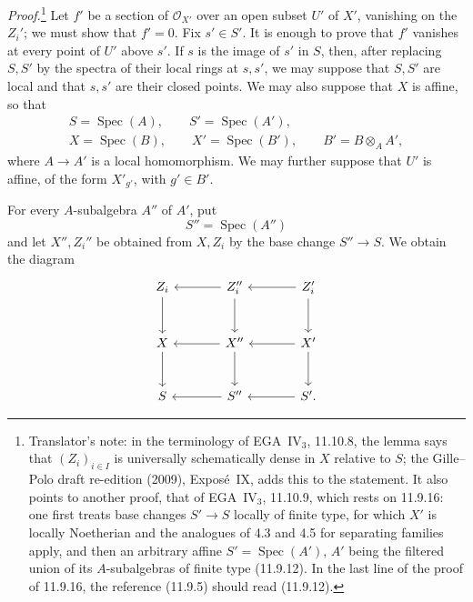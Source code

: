 \emph{Proof.}\footnote{Translator's note: in the terminology of
EGA~IV\(_3\), 11.10.8, the lemma says that \((Z_i)_{i\in I}\) is
universally schematically dense in \(X\) relative to \(S\); the
Gille--Polo draft re-edition (2009), Expos\'e~IX, adds this to the
statement. It also points to another proof, that of EGA~IV\(_3\),
11.10.9, which rests on 11.9.16: one first treats base changes
\(S'\to S\) locally of finite type, for which \(X'\) is locally
Noetherian and the analogues of 4.3 and 4.5 for separating families
apply, and then an arbitrary affine \(S'=\operatorname{Spec}(A')\), \(A'\)
being the filtered union of its \(A\)-subalgebras of finite type
(11.9.12). In the last line of the proof of 11.9.16, the reference
(11.9.5) should read (11.9.12).}
Let \(f'\) be a section of \(\mathscr O_{X'}\) over an open subset
\(U'\) of \(X'\), vanishing on the \(Z_i'\); we must show that \(f'=0\).
Fix \(s'\in S'\). It is enough to prove that \(f'\) vanishes at every
point of \(U'\) above \(s'\). If \(s\) is the image of \(s'\) in \(S\),
then, after replacing \(S,S'\) by the spectra of their local rings at
\(s,s'\), we may suppose that \(S,S'\) are local and that \(s,s'\) are
their closed points. We may also suppose that \(X\) is affine, so that
\[
  \begin{gathered}
    S=\operatorname{Spec}(A),\qquad
    S'=\operatorname{Spec}(A'),\\
    X=\operatorname{Spec}(B),\qquad
    X'=\operatorname{Spec}(B'),\qquad
    B'=B\otimes_A A',
  \end{gathered}
\]
where \(A\to A'\) is a local homomorphism. We may further suppose that
\(U'\) is affine, of the form \(X'_{g'}\), with \(g'\in B'\).

For every \(A\)-subalgebra \(A''\) of \(A'\), put
\[
  S''=\operatorname{Spec}(A'')
\]
and let \(X'',Z_i''\) be obtained from \(X,Z_i\) by the base change
\(S''\to S\). We obtain the diagram
\[
\begin{tikzcd}[column sep=large,row sep=large]
  Z_i \arrow[d] & Z_i'' \arrow[l]\arrow[d]
    & Z_i' \arrow[l]\arrow[d] \\
  X \arrow[d] & X'' \arrow[l]\arrow[d] & X' \arrow[l]\arrow[d] \\
  S & S'' \arrow[l] & S' \arrow[l].
\end{tikzcd}
\]

